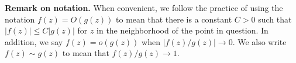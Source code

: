 \documentclass{exam}
\begin{document}
\textbf{Remark on notation. } When convenient, we follow the practice of using the notation $f(z) = O(g(z))$ to mean that there is a 
constant $C > 0$ such that $|f(z)| \leq C|g(z)|$ for $z$ in the neighborhood of the point in question. In addition, we say $f(z) = o(g(z))$
when $|f(z) / g(z)|\to 0$. We also write $f(z)\sim g(z)$ to mean that $f(z) / g(z)\to 1$. 
\end{document}

